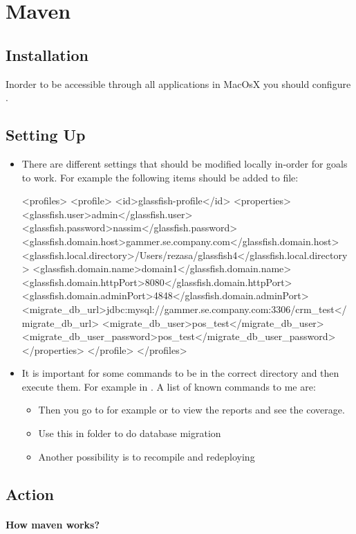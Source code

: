 \section{Maven}
\subsection{Installation}
Inorder to  be accessible through all applications in MacOsX you should configure .
\subsection{Setting Up}
\begin{itemize}
	\item There are different settings that should be modified locally in-order for goals to work. For example the following items should be added to  file: \newline
	\begin{javacode}[profile]
		<profiles>
		<profile>
		<id>glassfish-profile</id>
		<properties>
		<glassfish.user>admin</glassfish.user>
		<glassfish.password>nassim</glassfish.password>
		<glassfish.domain.host>gammer.se.company.com</glassfish.domain.host>
		<glassfish.local.directory>/Users/rezasa/glassfish4</glassfish.local.directory>
		<glassfish.domain.name>domain1</glassfish.domain.name>
		<glassfish.domain.httpPort>8080</glassfish.domain.httpPort>
		<glassfish.domain.adminPort>4848</glassfish.domain.adminPort>
		<migrate_db_url>jdbc:mysql://gammer.se.company.com:3306/crm_test</migrate_db_url>
		<migrate_db_user>pos_test</migrate_db_user>
		<migrate_db_user_password>pos_test</migrate_db_user_password>
		</properties>
		</profile>
		</profiles>
	\end{javacode}
	\item It is important for some commands to be in the correct directory and then execute them. For example in . A list of known commands to me are:
	\begin{itemize}
		\item {}\newline
		Then you go to for example  or  to view the reports and see the coverage.
		\item {}\newline
		Use this in  folder to do database migration
		\item Another possibility is to recompile and redeploying\newline
	\end{itemize}
\end{itemize}
\subsection{Action}
\paragraph{How maven works?}
